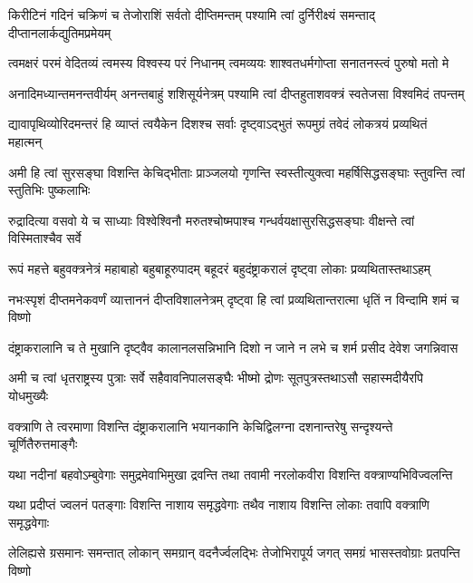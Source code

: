 \fourlineindentedshloka
{किरीटिनं गदिनं चक्रिणं च}
{तेजोराशिं सर्वतो दीप्तिमन्तम्}
{पश्यामि त्वां दुर्निरीक्ष्यं समन्ताद्}
{दीप्तानलार्कद्युतिमप्रमेयम्}%

\fourlineindentedshloka
{त्वमक्षरं परमं वेदितव्यं}
{त्वमस्य विश्वस्य परं निधानम्}
{त्वमव्ययः शाश्वतधर्मगोप्ता}
{सनातनस्त्वं पुरुषो मतो मे}%

\fourlineindentedshloka
{अनादिमध्यान्तमनन्तवीर्यम्}
{अनन्तबाहुं शशिसूर्यनेत्रम्}
{पश्यामि त्वां दीप्तहुताशवक्त्रं}
{स्वतेजसा विश्वमिदं तपन्तम्}%

\fourlineindentedshloka
{द्यावापृथिव्योरिदमन्तरं हि}
{व्याप्तं त्वयैकेन दिशश्च सर्वाः}
{दृष्ट्वाऽद्भुतं रूपमुग्रं तवेदं}
{लोकत्रयं प्रव्यथितं महात्मन्}%

\fourlineindentedshloka
{अमी हि त्वां सुरसङ्घा विशन्ति}
{केचिद्भीताः प्राञ्जलयो गृणन्ति}
{स्वस्तीत्युक्त्वा महर्षिसिद्धसङ्घाः}
{स्तुवन्ति त्वां स्तुतिभिः पुष्कलाभिः}%

\fourlineindentedshloka
{रुद्रादित्या वसवो ये च साध्याः}
{विश्वेश्विनौ मरुतश्चोष्मपाश्च}
{गन्धर्वयक्षासुरसिद्धसङ्घाः}
{वीक्षन्ते त्वां विस्मिताश्चैव सर्वे}%

\fourlineindentedshloka
{रूपं महत्ते बहुवक्त्रनेत्रं}
{महाबाहो बहुबाहूरुपादम्}
{बहूदरं बहुदंष्ट्राकरालं}
{दृष्ट्वा लोकाः प्रव्यथितास्तथाऽहम्}%

\fourlineindentedshloka
{नभःस्पृशं दीप्तमनेकवर्णं}
{व्यात्ताननं दीप्तविशालनेत्रम्}
{दृष्ट्वा हि त्वां प्रव्यथितान्तरात्मा}
{धृतिं न विन्दामि शमं च विष्णो}%

\fourlineindentedshloka
{दंष्ट्राकरालानि च ते मुखानि}
{दृष्ट्वैव कालानलसन्निभानि}
{दिशो न जाने न लभे च शर्म}
{प्रसीद देवेश जगन्निवास}%

\fourlineindentedshloka
{अमी च त्वां धृतराष्ट्रस्य पुत्राः}
{सर्वे सहैवावनिपालसङ्घैः}
{भीष्मो द्रोणः सूतपुत्रस्तथाऽसौ}
{सहास्मदीयैरपि योधमुख्यैः}%

\fourlineindentedshloka
{वक्त्राणि ते त्वरमाणा विशन्ति}
{दंष्ट्राकरालानि भयानकानि}
{केचिद्विलग्ना दशनान्तरेषु}
{सन्दृश्यन्ते चूर्णितैरुत्तमाङ्गैः}%

\fourlineindentedshloka
{यथा नदीनां बहवोऽम्बुवेगाः}
{समुद्रमेवाभिमुखा द्रवन्ति}
{तथा तवामी नरलोकवीरा}
{विशन्ति वक्त्राण्यभिविज्वलन्ति}%

\fourlineindentedshloka
{यथा प्रदीप्तं ज्वलनं पतङ्गाः}
{विशन्ति नाशाय समृद्धवेगाः}
{तथैव नाशाय विशन्ति लोकाः}
{तवापि वक्त्राणि समृद्धवेगाः}%

\fourlineindentedshloka
{लेलिह्यसे ग्रसमानः समन्तात्}
{लोकान् समग्रान् वदनैर्ज्वलद्भिः}
{तेजोभिरापूर्य जगत् समग्रं}
{भासस्तवोग्राः प्रतपन्ति विष्णो}%

